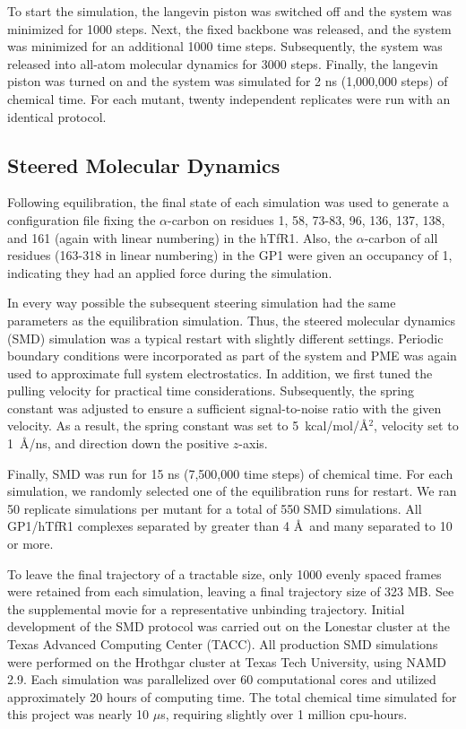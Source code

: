 \documentclass[journal=jacsat,manuscript=article]{achemso}
\begin{document}
To start the simulation, the langevin piston was switched off and the system was minimized for 1000 steps. Next, the fixed backbone was released, and the system was minimized for an additional 1000 time steps. Subsequently, the system was released into all-atom molecular dynamics for 3000 steps. Finally, the langevin piston was turned on and the system was simulated for 2 ns (1,000,000 steps) of chemical time. For each mutant, twenty independent replicates were run with an identical protocol.

\subsection{Steered Molecular Dynamics}

Following equilibration, the final state of each simulation was used to generate a configuration file fixing the $\alpha$-carbon on residues 1, 58, 73-83, 96, 136, 137, 138, and 161 (again with linear numbering) in the hTfR1. Also, the $\alpha$-carbon of all residues (163-318 in linear numbering) in the GP1 were given an occupancy of 1, indicating they had an applied force during the simulation. 

In every way possible the subsequent steering simulation had the same parameters as the equilibration simulation. Thus, the steered molecular dynamics (SMD) \cite{Is2001A,Is2001B} simulation was a typical restart with slightly different settings. Periodic boundary conditions were incorporated as part of the system and PME was again used to approximate full system electrostatics. In addition, we first tuned the pulling velocity for practical time considerations. Subsequently, the spring constant was adjusted to ensure a sufficient signal-to-noise ratio with the given velocity. As a result, the spring constant was set to 5~kcal/mol/\AA$^2$, velocity set to 1~\AA/ns, and direction down the positive $z$-axis.

Finally, SMD was run for 15 ns (7,500,000 time steps) of chemical time. For each simulation, we randomly selected one of the equilibration runs for restart. We ran 50 replicate simulations per mutant for a total of 550 SMD simulations. All GP1/hTfR1 complexes separated by greater than 4 \AA\ and many separated to 10 or more.

To leave the final trajectory of a tractable size, only 1000 evenly spaced frames were retained from each simulation, leaving a final trajectory size of 323 MB. See the supplemental movie for a representative unbinding trajectory. Initial development of the SMD protocol was carried out on the Lonestar cluster at the Texas Advanced Computing Center (TACC). All production SMD simulations were performed on the Hrothgar cluster at Texas Tech University, using NAMD 2.9. Each simulation was parallelized over 60 computational cores and utilized approximately 20 hours of computing time. The total chemical time simulated for this project was nearly 10 $\mu$s, requiring slightly over 1 million cpu-hours.
\end{document}
